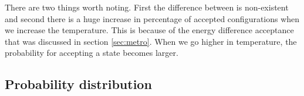 There are two things worth noting. First the difference between is non-existent and second there is a huge increase in percentage of accepted configurations when we increase the temperature. This is because of the energy difference acceptance that was discussed in section \ref{sec:metro}. When we go higher in temperature, the probability for accepting a state becomes larger.

















\pagebreak
\subsection{Probability distribution}


